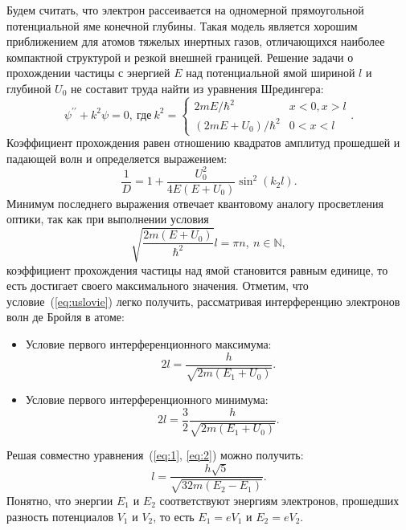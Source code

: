 \documentclass[a4paper,12pt]{article} %
\begin{document}
	Будем считать, что электрон рассеивается на одномерной прямоугольной потенциальной яме конечной глубины. Такая модель является хорошим приближением для атомов тяжелых инертных газов, отличающихся наиболее компактной структурой и резкой внешней границей. Решение задачи о прохождении частицы с энергией $E$ над потенциальной ямой шириной $l$ и глубиной $U_0$ не составит труда найти из уравнения Шредингера:\\
	\begin{equation*}
		\psi^{\prime\prime}+k^2\psi=0, \ \text{где}\
		k^2 =\begin{cases}
			2mE/\hbar^2 & x<0, x>l\\
			(2mE+U_0)/\hbar^2 & 0<x<l
		\end{cases}.
	\end{equation*}
	Коэффициент прохождения равен отношению квадратов амплитуд прошедшей и падающей волн и определяется выражением:
	\begin{equation*}
		\frac{1}{D} = 1 + \frac{U_0^2}{4E(E+U_0)}\sin^2(k_2l).
	\end{equation*}
	Минимум последнего выражения отвечает квантовому аналогу просветления оптики, так как при выполнении условия
	\begin{equation*}
		\tag{$\star$}
		\label{eq:uslovie}
		\sqrt{\frac{2m(E+U_0)}{\hbar^2}}l = \pi n, \ n\in\mathbb{N},
	\end{equation*}
	коэффициент прохождения частицы над ямой становится равным единице, то есть достигает своего максимального значения.
	Отметим, что условие~(\ref{eq:uslovie}) легко получить, рассматривая интерференцию электронов волн де Бройля в атоме:\\
	\begin{itemize}
		\item
			Условие первого интерференционного максимума:
			\begin{equation}
				\label{eq:1}
				2l = \frac{h}{\sqrt{2m(E_1+U_0)}}.
			\end{equation}
		\item
			Условие первого интерференционного минимума:
			\begin{equation}
				\label{eq:2}
				2l =\frac{3}{2} \frac{h}{\sqrt{2m(E_1+U_0)}}.
			\end{equation}			
	\end{itemize}

	Решая совместно уравнения~(\ref{eq:1}, \ref{eq:2}) можно получить:
	\begin{equation}
		\label{eq:l}
		l = \frac{h\sqrt{5}}{\sqrt{32m(E_2-E_1)}}.
	\end{equation}
	Понятно, что энергии $E_1$ и $E_2$ соответствуют энергиям электронов, прошедших разность потенциалов $V_1$ и $V_2$, то есть $E_1 = eV_1$ и $E_2 = eV_2$. 
	
\end{document}
